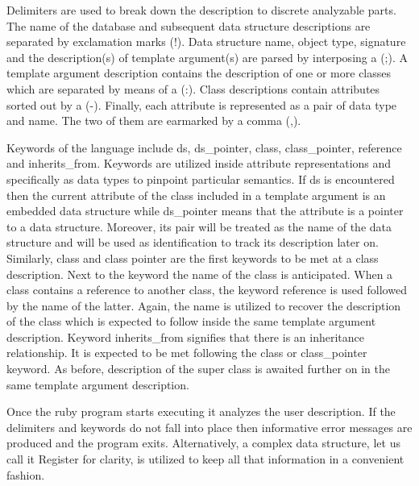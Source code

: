\documentclass[pdftex, 11pt, a4paper]{report}
\begin{document}
\par
Delimiters are used to break down the description to discrete analyzable parts. The name of the database and subsequent data structure descriptions are separated by exclamation marks (!). Data structure name, object type, signature and the description(s) of template argument(s) are parsed by interposing a (;). A template argument description contains the description of one or more classes which are separated by means of a (:). Class descriptions contain attributes sorted out by a (-). Finally, each attribute is represented as a pair of data type and name. The two of them are earmarked by a comma (,).
\par
Keywords of the language include ds, ds\_pointer, class, class\_pointer, reference and inherits\_from. Keywords are utilized inside attribute representations and specifically as data types to pinpoint particular semantics. If ds is encountered then the current attribute of the class included in a template argument is an embedded data structure while ds\_pointer means that the attribute is a pointer to a data structure. Moreover, its pair will be treated as the name of the data structure and will be used as identification to track its description later on. Similarly, class and class pointer are the first keywords to be met at a class description. Next to the keyword the name of the class is anticipated. When a class contains a reference to another class, the keyword reference is used followed by the name of the latter. Again, the name is utilized to recover the description of the class which is expected to follow inside the same template argument description. Keyword inherits\_from signifies that there is an inheritance relationship. It is expected to be met following the class or class\_pointer keyword. As before, description of the super class is awaited further on in the same template argument description.
\par
Once the ruby program starts executing it analyzes the user description. If the delimiters and keywords do not fall into place then informative error messages are produced and the program exits. Alternatively, a complex data structure, let us call it Register for clarity, is utilized to keep all that information in a convenient fashion. 
\par
\end{document}
